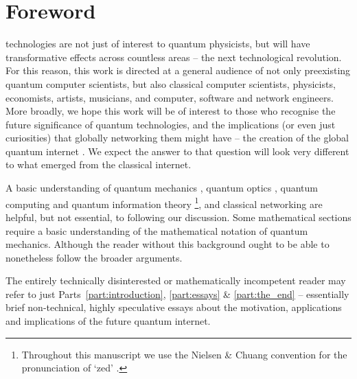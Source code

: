 %
%

\newline \newline
{}
\newline \newline
{}

\section{Foreword}\label{sec:foreword}

 technologies are not just of interest to quantum physicists, but will have transformative effects across countless areas -- the next technological revolution. For this reason, this work is directed at a general audience of not only preexisting quantum computer scientists, but also classical computer scientists, physicists, economists, artists, musicians, and computer, software and network engineers. More broadly, we hope this work will be of interest to those who recognise the future significance of quantum technologies, and the implications (or even just curiosities) that globally networking them might have -- the creation of the global quantum internet \cite{bib:van2014quantum, bib:Kimble2008}. We expect the answer to that question will look very different to what emerged from the classical internet.

A basic understanding of quantum mechanics \cite{bib:Sakurai94}, quantum optics \cite{bib:GerryKnight05}, quantum computing and quantum information theory \cite{bib:NielsenChuang00}\footnote{Throughout this manuscript we use the Nielsen \& Chuang convention for the pronunciation of `zed' \cite{bib:NielsenChuang00}.}, and classical networking \cite{bib:TanenbaumNet} are helpful, but not essential, to following our discussion. Some mathematical sections require a basic understanding of the mathematical notation of quantum mechanics. Although the reader without this background ought to be able to nonetheless follow the broader arguments.

The entirely technically disinterested or mathematically incompetent reader may refer to just Parts~\ref{part:introduction}, \ref{part:essays} \& \ref{part:the_end} -- essentially brief non-technical, highly speculative essays about the motivation, applications and implications of the future quantum internet.

